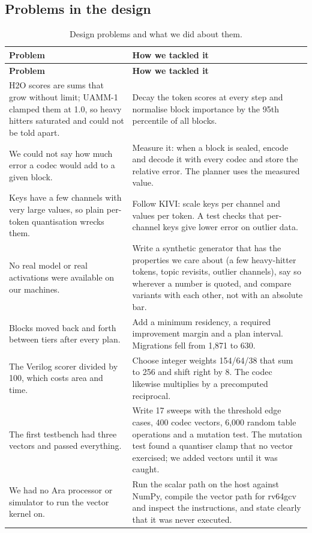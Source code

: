 \documentclass[12pt,a4paper]{report}
\begin{document}
\subsection{Problems in the design}
{\fontsize{8}{9.5}\selectfont\setlength{\tabcolsep}{3pt}
\begin{longtable}{>{\raggedright\arraybackslash}p{3.03in}>{\raggedright\arraybackslash}p{3.03in}}
\caption{Design problems and what we did about them.}\\
\toprule
\textbf{Problem} & \textbf{How we tackled it} \\\midrule\endfirsthead
\toprule \textbf{Problem} & \textbf{How we tackled it} \\\midrule\endhead
\bottomrule\endfoot
H2O scores are sums that grow without limit; UAMM-1 clamped them at 1.0, so heavy hitters saturated and could not be told apart. & Decay the token scores at every step and normalise block importance by the 95th percentile of all blocks. \\
We could not say how much error a codec would add to a given block. & Measure it: when a block is sealed, encode and decode it with every codec and store the relative error. The planner uses the measured value. \\
Keys have a few channels with very large values, so plain per-token quantisation wrecks them. & Follow KIVI: scale keys per channel and values per token. A test checks that per-channel keys give lower error on outlier data. \\
No real model or real activations were available on our machines. & Write a synthetic generator that has the properties we care about (a few heavy-hitter tokens, topic revisits, outlier channels), say so wherever a number is quoted, and compare variants with each other, not with an absolute bar. \\
Blocks moved back and forth between tiers after every plan. & Add a minimum residency, a required improvement margin and a plan interval. Migrations fell from 1,871 to 630. \\
The Verilog scorer divided by 100, which costs area and time. & Choose integer weights 154/64/38 that sum to 256 and shift right by 8. The codec likewise multiplies by a precomputed reciprocal. \\
The first testbench had three vectors and passed everything. & Write 17 sweeps with the threshold edge cases, 400 codec vectors, 6,000 random table operations and a mutation test. The mutation test found a quantiser clamp that no vector exercised; we added vectors until it was caught. \\
We had no Ara processor or simulator to run the vector kernel on. & Run the scalar path on the host against NumPy, compile the vector path for rv64gcv and inspect the instructions, and state clearly that it was never executed. \\
\bottomrule
\end{longtable}}
\end{document}
